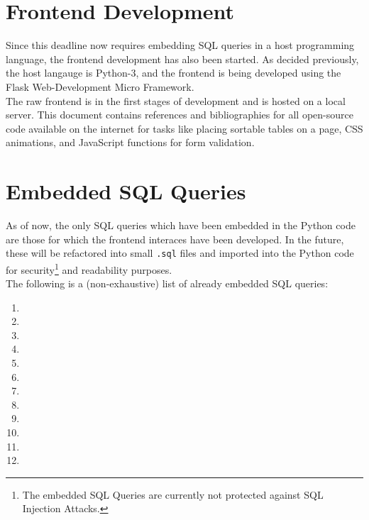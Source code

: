 \documentclass[12pt]{report}
\begin{document}
    \section*{\Huge Frontend Development}
    \vspace*{10pt}

    Since this deadline now requires embedding SQL queries in a host programming language, the frontend development has also been started.
    As decided previously, the host langauge is Python-3, and the frontend is being developed using the Flask Web-Development Micro Framework. \\
    The raw frontend is in the first stages of development and is hosted on a local server.
    This document contains references and bibliographies for all open-source code available on the internet for tasks like placing sortable tables on a page,
    CSS animations, and JavaScript functions for form validation.

    \section*{\Huge Embedded SQL Queries}
    \vspace*{10pt}

    As of now, the only SQL queries which have been embedded in the Python code are those for which the frontend interaces have been developed.
    In the future, these will be refactored into small \texttt{.sql} files and imported into the Python code for security\footnote{
        The embedded SQL Queries are currently not protected against SQL Injection Attacks.
    } and readability purposes.
    \vspace*{10pt} \\
    The following is a (non-exhaustive) list of already embedded SQL queries:

    \begin{enumerate}
        \item 
        \item 
        \item 
        \item 
        \item 
        \item 
        \item 
        \item 
        \item 
        \item 
        \item 
        \item 
    \end{enumerate}
\end{document}
